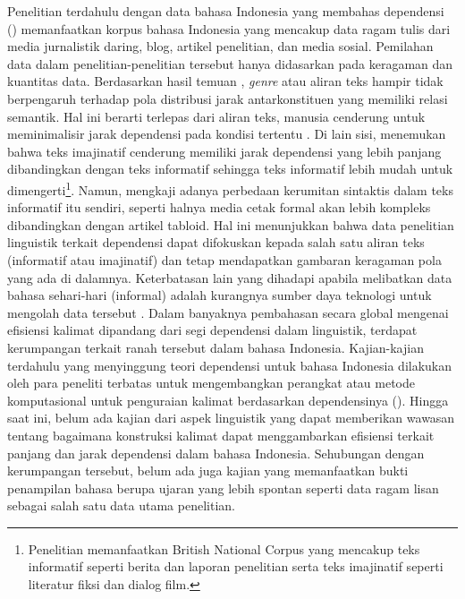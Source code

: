 Penelitian terdahulu dengan data bahasa Indonesia yang membahas dependensi (\citealp{kamayani2011dependency, green2012indonesian, irmawati2015dependency, futrell2015large}) memanfaatkan korpus bahasa Indonesia yang mencakup data ragam tulis dari media jurnalistik daring, blog, artikel penelitian, dan media sosial. Pemilahan data dalam penelitian-penelitian tersebut hanya didasarkan pada keragaman dan kuantitas data. Berdasarkan hasil temuan \cite{wang2017effects}, \textit{genre} atau aliran teks hampir tidak berpengaruh terhadap pola distribusi jarak antarkonstituen yang memiliki relasi semantik. Hal ini berarti terlepas dari aliran teks, manusia cenderung untuk meminimalisir jarak dependensi pada kondisi tertentu \citep{wang2017effects}. Di lain sisi, \citep{wang2017effects} menemukan bahwa teks imajinatif cenderung memiliki jarak dependensi yang lebih panjang dibandingkan dengan teks informatif sehingga teks informatif lebih mudah untuk dimengerti\footnote{Penelitian \cite{wang2017effects} memanfaatkan British National Corpus yang mencakup teks informatif seperti berita dan laporan penelitian serta teks imajinatif seperti literatur fiksi dan dialog film.}. Namun, \cite{miller2011critical} mengkaji adanya perbedaan kerumitan sintaktis dalam teks informatif itu sendiri, seperti halnya media cetak formal akan lebih kompleks dibandingkan dengan artikel tabloid. Hal ini menunjukkan bahwa data penelitian linguistik terkait dependensi dapat difokuskan kepada salah satu aliran teks (informatif atau imajinatif) dan tetap mendapatkan gambaran keragaman pola yang ada di dalamnya. Keterbatasan lain yang dihadapi apabila melibatkan data bahasa sehari-hari (informal) adalah kurangnya sumber daya teknologi untuk mengolah data tersebut \citep{green2012indonesian}. Dalam banyaknya pembahasan secara global mengenai efisiensi kalimat dipandang dari segi dependensi dalam linguistik, terdapat kerumpangan terkait ranah tersebut dalam bahasa Indonesia. Kajian-kajian terdahulu yang menyinggung teori dependensi untuk bahasa Indonesia dilakukan oleh para peneliti terbatas untuk mengembangkan perangkat atau metode komputasional untuk penguraian kalimat berdasarkan dependensinya (\citealp{kamayani2011dependency, green2012indonesian, irmawati2015dependency}). Hingga saat ini, belum ada kajian dari aspek linguistik yang dapat memberikan wawasan tentang bagaimana konstruksi kalimat dapat menggambarkan efisiensi terkait panjang dan jarak dependensi dalam bahasa Indonesia. Sehubungan dengan kerumpangan tersebut, belum ada juga kajian yang memanfaatkan bukti penampilan bahasa berupa ujaran yang lebih spontan seperti data ragam lisan sebagai salah satu data utama penelitian. 



